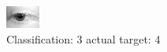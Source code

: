 \begin{figure}[h!]
\begin{center}
\includegraphics[width=0.60\columnwidth]{figures/ID2571_class_3_target_4.png}
\end{center}
\caption{ Classification: 3 actual target: 4}
\label{fig:ID2571_class_3_target_4}
\end{figure}
